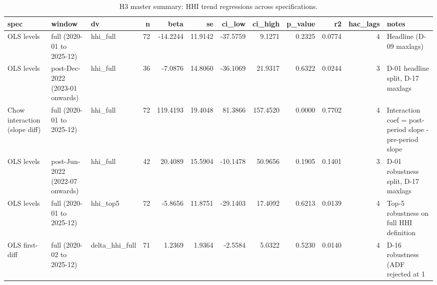 \begin{table}
\caption{H3 master summary: HHI trend regressions across specifications.}
\label{tbl:h3_master_summary}
\begin{tabular}{lllrrrrrrrrl}
\toprule
spec & window & dv & n & beta & se & ci_low & ci_high & p_value & r2 & hac_lags & notes \\
\midrule
OLS levels & full (2020-01 to 2025-12) & hhi_full & 72 & -14.2244 & 11.9142 & -37.5759 & 9.1271 & 0.2325 & 0.0774 & 4 & Headline (D-09 maxlags) \\
OLS levels & post-Dec-2022 (2023-01 onwards) & hhi_full & 36 & -7.0876 & 14.8060 & -36.1069 & 21.9317 & 0.6322 & 0.0244 & 3 & D-01 headline split, D-17 maxlags \\
Chow interaction (slope diff) & full (2020-01 to 2025-12) & hhi_full & 72 & 119.4193 & 19.4048 & 81.3866 & 157.4520 & 0.0000 & 0.7702 & 4 & Interaction coef = post-period slope - pre-period slope \\
OLS levels & post-Jun-2022 (2022-07 onwards) & hhi_full & 42 & 20.4089 & 15.5904 & -10.1478 & 50.9656 & 0.1905 & 0.1401 & 3 & D-01 robustness split, D-17 maxlags \\
OLS levels & full (2020-01 to 2025-12) & hhi_top5 & 72 & -5.8656 & 11.8751 & -29.1403 & 17.4092 & 0.6213 & 0.0139 & 4 & Top-5 robustness on full HHI definition \\
OLS first-diff & full (2020-02 to 2025-12) & delta_hhi_full & 71 & 1.2369 & 1.9364 & -2.5584 & 5.0322 & 0.5230 & 0.0140 & 4 & D-16 robustness (ADF rejected at 1%
\bottomrule
\end{tabular}
\end{table}
